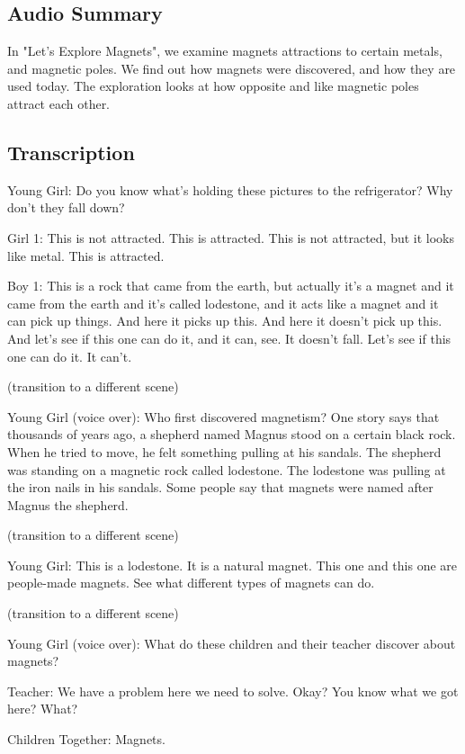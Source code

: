 \subsection{Audio Summary}

In "Let's Explore Magnets", we examine magnets attractions to certain metals, and magnetic poles. We find out how magnets were discovered, and how they are used today. The exploration looks at how opposite and like magnetic poles attract each other.

\subsection{Transcription}

Young Girl: Do you know what's holding these pictures to the refrigerator? Why don't they fall down?

Girl 1: This is not attracted. This is attracted. This is not attracted, but it looks like metal. This is attracted.

Boy 1: This is a rock that came from the earth, but actually it's a magnet and it came from the earth and it's called lodestone, and it acts like a magnet and it can pick up things. And here it picks up this. And here it doesn't pick up this. And let's see if this one can do it, and it can, see. It doesn't fall. Let's see if this one can do it. It can't.

(transition to a different scene)

Young Girl (voice over): Who first discovered magnetism? One story says that thousands of years ago, a shepherd named Magnus stood on a certain black rock. When he tried to move, he felt something pulling at his sandals. The shepherd was standing on a magnetic rock called lodestone. The lodestone was pulling at the iron nails in his sandals. Some people say that magnets were named after Magnus the shepherd.

(transition to a different scene)

Young Girl: This is a lodestone. It is a natural magnet. This one and this one are people-made magnets. See what different types of magnets can do.

(transition to a different scene)

Young Girl (voice over): What do these children and their teacher discover about magnets?

Teacher: We have a problem here we need to solve. Okay? You know what we got here? What?

Children Together: Magnets.

